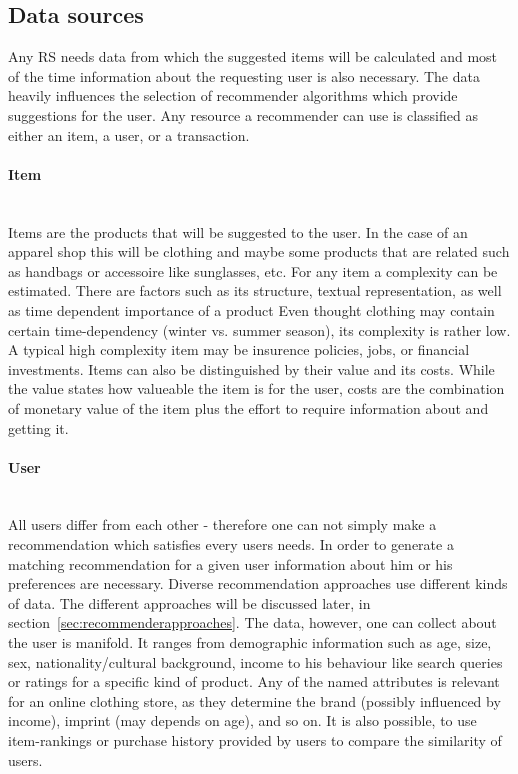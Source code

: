 \subsection{Data sources}
Any RS needs data from which the suggested items will be calculated and most of the time information about the requesting user is also necessary.
The data heavily influences the selection of recommender algorithms which provide suggestions for the user.\citep[p.~7-8]{ricci:2011}
Any resource a recommender can use is classified as either an item, a user, or a transaction.

\paragraph{Item}~\\
Items are the products that will be suggested to the user.
In the case of an apparel shop this will be clothing and maybe some products that are related such as handbags or accessoire like sunglasses, etc.
For any item a complexity can be estimated.
There are factors such as its structure, textual representation, as well as time dependent importance of a product
Even thought clothing may contain certain time-dependency (winter vs. summer season), its complexity is rather low.
A typical high complexity item may be insurence policies, jobs, or financial investments.
Items can also be distinguished by their value and its costs.
While the value states how valueable the item is for the user, costs are the combination of monetary value of the item plus the effort to require information about and getting it.
\citep[p.~8]{ricci:2011}

\paragraph{User}~\\
All users differ from each other - therefore one can not simply make a recommendation which satisfies every users needs.
In order to generate a matching recommendation for a given user information about him or his preferences are necessary.
Diverse recommendation approaches use different kinds of data.
The different approaches will be discussed later, in section~\ref{sec:recommenderapproaches}.
The data, however, one can collect about the user is manifold.
It ranges from demographic information such as age, size, sex, nationality/cultural background, income to his behaviour like search queries or ratings for a specific kind of product.
Any of the named attributes is relevant for an online clothing store, as they determine the brand (possibly influenced by income), imprint (may depends on age), and so on.\citep[p.8-9]{ricci:2011}
It is also possible, to use item-rankings or purchase history provided by users to compare the similarity of users.\citep[p.~377-378]{pradel:2011}


